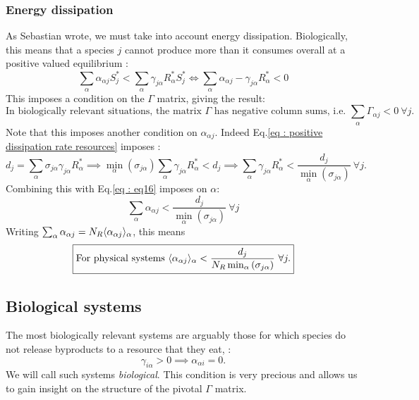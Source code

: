 \documentclass[12pt, titlepage]{report}
\begin{document}
			\subsubsection{Energy dissipation}
	As Sebastian wrote, we must take into account energy dissipation. Biologically, this means that a species $j$ cannot produce more than it consumes overall at a positive valued equilibrium :
	\begin{equation}
		\sum_{\alpha}\alpha_{\alpha j}S^*_j <  \sum_{\alpha} \gamma_{j \alpha}R^*_\alpha S^*_j \iff \sum_{\alpha} \alpha_{\alpha j} - \gamma_{j \alpha}R^*_\alpha < 0 \label{eq : eq16}
	\end{equation}
	This imposes a condition on the $\Gamma$ matrix, giving the result:
	\begin{equation}
		\boxed{\text{In biologically relevant situations, the matrix $\Gamma$ has negative column sums, i.e. $\sum_\alpha \Gamma_{\alpha j}<0 \ \forall j$.}} \label{eq : dissipation condition}
	\end{equation}
	Note that this imposes another condition on $\alpha_{\alpha j}$. Indeed Eq.\eqref{eq : positive dissipation rate resources} imposes :
	\begin{equation}
		d_j = \sum_\alpha \sigma_{j\alpha}\gamma_{j\alpha}R^*_\alpha \implies  \min_\alpha\left(\sigma_{j\alpha}\right) \sum_\alpha \gamma_{j\alpha}R^*_\alpha < d_j  \implies \sum_\alpha \gamma_{j\alpha}R^*_\alpha < \frac{d_j}{\min_\alpha\left(\sigma_{j\alpha}\right)} \ \forall j.
	\end{equation}
	Combining this with Eq.\eqref{eq : eq16} imposes on $\alpha$:
	\begin{equation}
		\sum_\alpha \alpha_{\alpha j} < \frac{d_j}{\min_\alpha\left(\sigma_{j\alpha}\right)} \ \forall j
	\end{equation}
	Writing $\sum_\alpha \alpha_{\alpha j} = N_R \langle \alpha_{\alpha j} \rangle_\alpha$, this means
	\begin{equation}
		\boxed{\text{For physical systems }\langle \alpha_{\alpha j} \rangle_\alpha < \frac{d_j}{N_R \min_\alpha\left(\sigma_{j\alpha}\right)} \ \forall j.}
	\end{equation}
		\subsection{Biological systems}
	The most biologically relevant systems are arguably those for which species do not release byproducts to a resource that they eat, \ie :
	\begin{equation}
		\gamma_{i\alpha} > 0 \implies \alpha_{\alpha i} = 0. \label{eq : biological condition}
	\end{equation}
	We will call such systems \textit{biological}. This condition is very precious and allows us to gain insight on the structure of the pivotal $\Gamma$ matrix.
\end{document}
